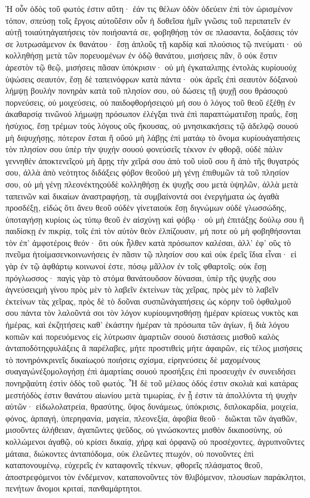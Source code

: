 Ἡ οὖν ὁδὸς τοῦ φωτός ἐστιν αὕτη· ἐάν τις θέλων ὁδὸν ὁδεύειν ἐπὶ τὸν ὡρισμένον τόπον, σπεύσῃ τοῖς ἔργοις αὐτοῦἔσιν οὖν ἡ δοθεῖσα ἡμῖν γνῶσις τοῦ περιπατεῖν ἐν αὐτῇ τοιαύτηἀγαπήσεις τὸν ποιήσαντά σε, φοβηθήσῃ τόν σε πλασαντα, δοξάσεις τόν σε λυτρωσάμενον ἐκ θανάτου· ἔσῃ ἁπλοῦς τῇ καρδίᾳ καὶ πλούσιος τῷ πνεύματι· οὐ κολληθήσῃ μετὰ τῶν πορευομένων ἐν ὁδῷ θανάτου, μισήσεις πᾶν, ὃ οὐκ ἔστιν ἀρεστὸν τῷ θεῷ, μισήσεις πᾶσαν ὑπόκρισιν· οὐ μὴ ἐγκαταλιπῃς ἐντολὰς κυρίουοὐχ ὑψώσεις σεαυτόν, ἔσῃ δὲ ταπεινόφρων κατὰ πάντα· οὐκ ἀρεῖς ἐπὶ σεαυτὸν δόξανοὐ λήμψῃ βουλὴν πονηρὰν κατὰ τοῦ πλησίον σου, οὐ δώσεις τῇ ψυχῇ σου θράσοςοὐ πορνεύσεις, οὐ μοιχεύσεις, οὐ παιδοφθορήσειςοὐ μή σου ὁ λόγος τοῦ θεοῦ ἐξέθῃ ἐν ἀκαθαρσίᾳ τινῶνοὐ λήμωψῃ πρόσωπον ἐλέγξαι τινὰ ἐπὶ παραπτώματιἔσῃ πραΰς, ἔσῃ ἡσύχιος, ἔσῃ τρέμων τοὺς λόγους οὓς ἤκουσας, οὐ μνησικακήσεις τῷ ἀδελφῷ σουοὐ μὴ διψυχήσῃς, πότερον ἔσται ἢ οὔοὐ μὴ λάβῃς ἐπὶ ματάῳ τὸ ὄνομα κυρίουἀγαπήσεις τὸν πλησίον σου ὑπὲρ τὴν ψυχήν σουοὐ φονεύσεῖς τέκνον ἐν φθορᾷ, οὐδὲ πάλιν γεννηθὲν ἀποκτενεῖςοὐ μὴ ἄρῃς τὴν χεῖρά σου ἀπὸ τοῦ υἱοῦ σου ἢ ἀπὸ τῆς θυγατρός σου, ἀλλὰ ἀπὸ νεότητος διδάξεις φόβον θεοῦοὐ μὴ γένῃ ἐπιθυμῶν τὰ τοῦ πλησίον σου, οὐ μὴ γένῃ πλεονέκτηςοὐδὲ κολληθήσῃ ἐκ ψυχῆς σου μετὰ ὑψηλῶν, ἀλλὰ μετὰ ταπεινῶν καὶ δικαίων ἀναστραφήσῃ, τὰ συμβαίνοντά σοι ἐνεργήματα ὡς ἀγαθὰ προσδέξῃ, εἰδώς ὅτι ἄνευ θεοῦ οὐδὲν γίνεταιοὐκ ἔσῃ διγνώμων οὐδὲ γλωσσώδης, ὑποταγήσῃ κυρίοις ὡς τύπῳ θεοῦ ἐν αἰσχύνῃ καὶ φόβῳ· οὐ μὴ ἐπιτάξῃς δούλῳ σου ἢ παιδίσκῃ ἐν πικρίᾳ, τοῖς ἐπὶ τὸν αὐτὸν θεὸν ἐλπίζουσιν, μή ποτε οὐ μὴ φοβηθήσονται τὸν ἐπ’ ἀμφοτέροις θεόν· ὅτι οὐκ ἦλθεν κατὰ πρόσωπον καλέσαι, ἀλλ’ ἐφ’ οὓς τὸ πνεῦμα ἡτοίμασενκοινωνήσεις ἐν πᾶσιν τῷ πλησίον σου καὶ οὐκ ἐρεῖς ἴδια εἶναι· εἰ γὰρ ἐν τῷ ἀφθάρτῳ κοινωνοί ἐστε, πόσῳ μᾶλλον ἐν τοῖς φθαρτοῖς; οὐκ ἔσῃ πρόγλωσσος· παγὶς γὰρ τὸ στόμα θανάτουὅσον δύνασαι, ὑπὲρ τῆς ψυχῆς σου ἁγνεύσειςμὴ γίνου πρὸς μὲν τὸ λαβεῖν ἐκτείνων τὰς χεῖρας, πρὸς μὲν τὸ λαβεῖν ἐκτείνων τὰς χεῖρας, πρὸς δὲ τὸ δοῦναι συσπῶνἀγαπήσεις ὡς κόρην τοῦ ὀφθαλμοῦ σου πάντα τὸν λαλοῦντά σοι τὸν λόγον κυρίουμνησθήσῃ ἡμέραν κρίσεως νυκτὸς και ἡμέρας, καὶ ἐκζητήσεις καθ’ ἑκάστην ἡμέραν τὰ πρόσωπα τῶν ἁγίων, ἢ διὰ λόγου κοπιῶν καὶ πορευόμενος εἰς λύτρωσιν ἁμαρτιῶν σουοὐ διστάσεις μισθοῦ καλὸς ἀνταποδότηςφυλάξεις ἃ παρέλαβες, μήτε προστιθεὶς μήτε ἀφαιρῶν, εἰς τέλος μισήσεις τὸ πονηρόνκρινεῖς δικαίωςοὐ ποιήσεις σχίσμα, εἰρηνεύσεις δὲ μαχομένους συαγαγώνἐξομολογήσῃ ἐπὶ ἁμαρτίαις σουοὐ προσήξεις ἐπὶ προσευχὴν ἐν συνειδήσει πονηρᾷαὑτη ἐστὶν ὁδὸς τοῦ φωτός.
Ἧ δὲ τοῦ μέλαος ὁδός ἐστιν σκολιὰ καὶ κατάρας μεστήὁδὸς ἐστιν θανάτου αἰωνίου μετὰ τιμωρίας, ἐν ᾗ ἐστιν τὰ ἀπολλύντα τὴ ψυχὴν αὐτῶν· εἰδωλολατρεία, θρασύτης, ὕψος δυνάμεως, ὑπόκρισις, διπλοκαρδία, μοιχεία, φόνος, ἁρπαγή, ὑπερηφανία, μαγεία, πλεονεξία, ἀφοβία θεοῦ· διῶκται τῶν ἀγαθῶν, μισοῦντες ἀλήθειαν, ἀγαπῶντες ψεῦδος, οὐ γινώσκοντες μισθὸν δικαιοσύνης, οὐ κολλώμενοι ἀγαθῷ, οὐ κρίσει δικαίᾳ, χήρᾳ καὶ ὀρφανῷ οὐ προσέχοντες, ἀγρυπνοῦντες μάταια, διώκοντες ἀνταπόδομα, οὐκ ἐλεῶντες πτωχόν, οὐ πονοῦντες ἐπὶ καταπονουμένῳ, εὐχερεῖς ἐν καταφονεῖς τέκνων, φθορεῖς πλάσματος θεοῦ, ἀποστρεφόμενοι τὸν ἐνδέμενον, καταπονοῦντες τὸν θλιβόμενον, πλουσίων παράκλητοι, πενήτων ἄνομοι κριταί, πανθαμάρτητοι.
